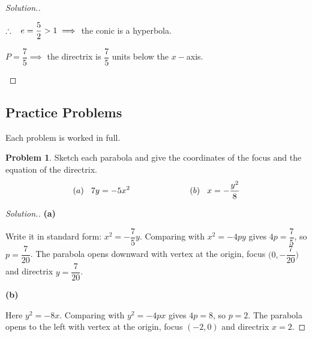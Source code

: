 \documentclass[11pt,a4paper]{article}
\theoremstyle{definition}
\newtheorem{problemx}{Problem}[subsection]
\newenvironment{problem}{\begin{problemx}}{\end{problemx}}
\newenvironment{solution}
  {\renewcommand{\qedsymbol}{}\begin{proof}[\textit{Solution}.]}
  {\end{proof}}
\newcommand{\subhead}[1]{%
  \par\medskip\noindent\textbf{#1}\par\nobreak\smallskip}
\begin{document}
\begin{solution}
\begin{enumerate}
$\therefore\hspace{0.3cm} e = \dfrac{5}{2}>1 \implies $ the conic is a hyperbola.

$P = \dfrac{7}{5} \implies$ the directrix is $\dfrac{7}{5}$ units below the $x-$axis.

\begin{figure}[H]
\centering
{}
\end{figure}
\end{enumerate} 

\pagebreak
\end{solution}

\subsection{Practice Problems}

Each problem is worked in full.

\begin{problem}
Sketch each parabola and give the coordinates of the focus and the equation of
the directrix.
$$(a)\hspace{0.3cm} 7y = -5x^2 \hspace{2.5cm} (b)\hspace{0.3cm} x = -\frac{y^2}{8}$$
\end{problem}
\begin{solution}
\subhead{(a)}
Write it in standard form: $x^2 = -\dfrac{7}{5}y$. Comparing with $x^2 = -4py$
gives $4p = \dfrac{7}{5}$, so $p = \dfrac{7}{20}$. The parabola opens downward
with vertex at the origin, focus $\Big(0, -\dfrac{7}{20}\Big)$ and directrix
$y = \dfrac{7}{20}$.

\subhead{(b)}
Here $y^2 = -8x$. Comparing with $y^2 = -4px$ gives $4p = 8$, so $p = 2$. The
parabola opens to the left with vertex at the origin, focus $(-2, 0)$ and
directrix $x = 2$.
\end{solution}
\end{document}
